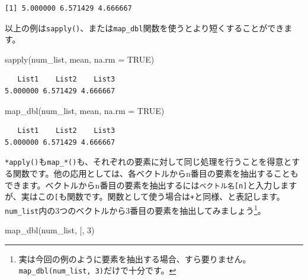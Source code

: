 \documentclass[
  a4paper,
  pandoc,
  ja=standard,
  jafont=haranoaji]{bxjsbook}
\newenvironment{Shaded}{\begin{snugshade}}{\end{snugshade}}
\newcommand{\AttributeTok}[1]{\textcolor[rgb]{0.00,0.48,0.65}{#1}}
\newcommand{\ConstantTok}[1]{\textcolor[rgb]{0.56,0.35,0.01}{#1}}
\newcommand{\DecValTok}[1]{\textcolor[rgb]{0.68,0.00,0.00}{#1}}
\newcommand{\FunctionTok}[1]{\textcolor[rgb]{0.28,0.35,0.67}{#1}}
\newcommand{\NormalTok}[1]{\textcolor[rgb]{0.00,0.48,0.65}{#1}}
\newcommand{\StringTok}[1]{\textcolor[rgb]{0.13,0.47,0.30}{#1}}
\begin{document}
\begin{verbatim}
[1] 5.000000 6.571429 4.666667
\end{verbatim}

以上の例は\texttt{sapply()}、または\texttt{map\_dbl}関数を使うとより短くすることができます。

\begin{Shaded}
\begin{Highlighting}[numbers=left,,]
\FunctionTok{sapply}\NormalTok{(num\_list, mean, }\AttributeTok{na.rm =} \ConstantTok{TRUE}\NormalTok{)}
\end{Highlighting}
\end{Shaded}

\begin{verbatim}
   List1    List2    List3 
5.000000 6.571429 4.666667 
\end{verbatim}

\begin{Shaded}
\begin{Highlighting}[numbers=left,,]
\FunctionTok{map\_dbl}\NormalTok{(num\_list, mean, }\AttributeTok{na.rm =} \ConstantTok{TRUE}\NormalTok{)}
\end{Highlighting}
\end{Shaded}

\begin{verbatim}
   List1    List2    List3 
5.000000 6.571429 4.666667 
\end{verbatim}

\texttt{*apply()}も\texttt{map\_*()}も、それぞれの要素に対して同じ処理を行うことを得意とする関数です。他の応用としては、各ベクトルからn番目の要素を抽出することもできます。ベクトルからn番目の要素を抽出するには\texttt{ベクトル名{[}n{]}}と入力しますが、実はこの\texttt{{[}}も関数です。関数として使う場合は\texttt{+}と同様、\texttt{\textasciigrave{}{[}\textasciigrave{}}と表記します。\texttt{num\_list}内の3つのベクトルから3番目の要素を抽出してみましょう\footnote{実は今回の例のように要素を抽出する場合、\texttt{\textasciigrave{}{[}\textasciigrave{}}すら要りません。\texttt{map\_dbl(num\_list,\ 3)}だけで十分です。}。

\begin{Shaded}
\begin{Highlighting}[numbers=left,,]
\FunctionTok{map\_dbl}\NormalTok{(num\_list, }\StringTok{\textasciigrave{}}\AttributeTok{[}\StringTok{\textasciigrave{}}\NormalTok{, }\DecValTok{3}\NormalTok{)}
\end{Highlighting}
\end{Shaded}
\end{document}
